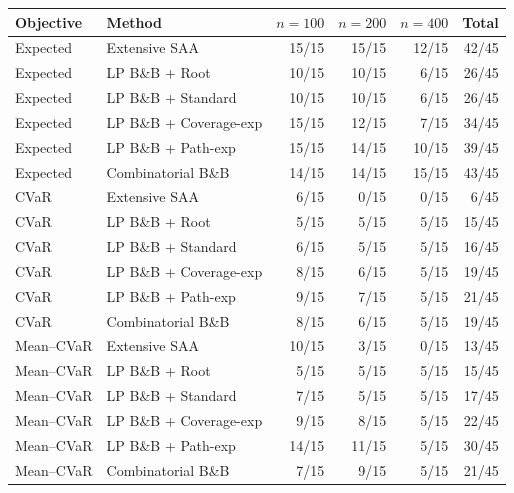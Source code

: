 \begin{tabular}{llrrrr}
\toprule
Objective & Method & $n=100$ & $n=200$ & $n=400$ & Total \\
\midrule
Expected & Extensive SAA & 15/15 & 15/15 & 12/15 & 42/45 \\
Expected & LP B\&B + Root & 10/15 & 10/15 & 6/15 & 26/45 \\
Expected & LP B\&B + Standard & 10/15 & 10/15 & 6/15 & 26/45 \\
Expected & LP B\&B + Coverage-exp & 15/15 & 12/15 & 7/15 & 34/45 \\
Expected & LP B\&B + Path-exp & 15/15 & 14/15 & 10/15 & 39/45 \\
Expected & Combinatorial B\&B & 14/15 & 14/15 & 15/15 & 43/45 \\
\midrule
CVaR & Extensive SAA & 6/15 & 0/15 & 0/15 & 6/45 \\
CVaR & LP B\&B + Root & 5/15 & 5/15 & 5/15 & 15/45 \\
CVaR & LP B\&B + Standard & 6/15 & 5/15 & 5/15 & 16/45 \\
CVaR & LP B\&B + Coverage-exp & 8/15 & 6/15 & 5/15 & 19/45 \\
CVaR & LP B\&B + Path-exp & 9/15 & 7/15 & 5/15 & 21/45 \\
CVaR & Combinatorial B\&B & 8/15 & 6/15 & 5/15 & 19/45 \\
\midrule
Mean--CVaR & Extensive SAA & 10/15 & 3/15 & 0/15 & 13/45 \\
Mean--CVaR & LP B\&B + Root & 5/15 & 5/15 & 5/15 & 15/45 \\
Mean--CVaR & LP B\&B + Standard & 7/15 & 5/15 & 5/15 & 17/45 \\
Mean--CVaR & LP B\&B + Coverage-exp & 9/15 & 8/15 & 5/15 & 22/45 \\
Mean--CVaR & LP B\&B + Path-exp & 14/15 & 11/15 & 5/15 & 30/45 \\
Mean--CVaR & Combinatorial B\&B & 7/15 & 9/15 & 5/15 & 21/45 \\
\bottomrule
\end{tabular}
